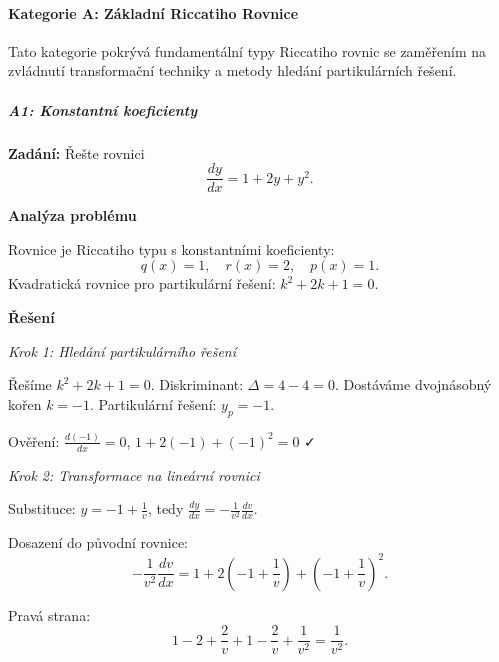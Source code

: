 \vspace{0.8\baselineskip}

\paragraph*{Kategorie A: Základní Riccatiho Rovnice}
\label{par:l2-riccati-kategorie-a-zakladni}

Tato kategorie pokrývá fundamentální typy Riccatiho rovnic se zaměřením na zvládnutí transformační techniky a metody hledání partikulárních řešení.

\vspace{0.6\baselineskip}

\subparagraph*{A1: Konstantní koeficienty}
\label{subpar:l2-riccati-a1-konstantni-koeficienty}

\begin{example}
\label{ex:l2-riccati-a1-lehky-zakladni}

\noindent\textbf{Zadání:} Řešte rovnici
\[
\frac{dy}{dx} = 1 + 2y + y^2.
\]

\vspace{1.5\baselineskip}

\noindent\textbf{Analýza problému}

\noindent Rovnice je Riccatiho typu s konstantními koeficienty:
\[
q(x) = 1, \quad r(x) = 2, \quad p(x) = 1.
\]
Kvadratická rovnice pro partikulární řešení: $k^2 + 2k + 1 = 0$.

\vspace{1.5\baselineskip}

\noindent\textbf{Řešení}

\noindent\textit{Krok 1: Hledání partikulárního řešení}

Řešíme $k^2 + 2k + 1 = 0$. Diskriminant: $\Delta = 4 - 4 = 0$. 
Dostáváme dvojnásobný kořen $k = -1$. Partikulární řešení: $y_p = -1$.

Ověření: $\frac{d(-1)}{dx} = 0$, $1 + 2(-1) + (-1)^2 = 0$ ✓

\noindent\textit{Krok 2: Transformace na lineární rovnici}

Substituce: $y = -1 + \frac{1}{v}$, tedy $\frac{dy}{dx} = -\frac{1}{v^2}\frac{dv}{dx}$.

Dosazení do původní rovnice:
\[
-\frac{1}{v^2}\frac{dv}{dx} = 1 + 2\left(-1 + \frac{1}{v}\right) + \left(-1 + \frac{1}{v}\right)^2.
\]

Pravá strana:
\[
1 - 2 + \frac{2}{v} + 1 - \frac{2}{v} + \frac{1}{v^2} = \frac{1}{v^2}.
\]


\end{example}
